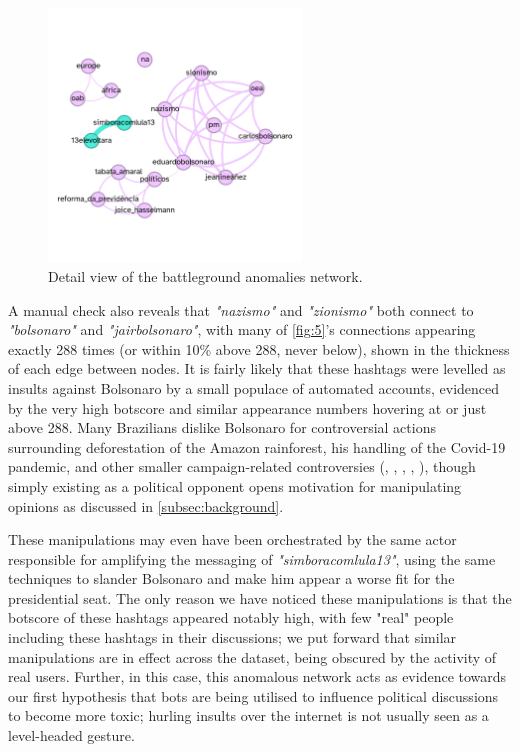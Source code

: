\documentclass[a4paper,11pt]{article}  %
\begin{document}
	\begin{figure}%
		\begin{center}
			\includegraphics[width=0.6\textwidth]{images/net_anom_detail}
		\end{center}
		\caption{Detail view of the battleground anomalies network.}
		\label{fig:5}
	\end{figure}

	A manual check also reveals that \textit{"nazismo"} and \textit{"zionismo"} both connect to \textit{"bolsonaro"} and \textit{"jairbolsonaro"}, with many of \autoref{fig:5}'s connections appearing exactly 288 times (or within 10\% above 288, never below), shown in the thickness of each edge between nodes. It is fairly likely that these hashtags were levelled as insults against Bolsonaro by a small populace of automated accounts, evidenced by the very high botscore and similar appearance numbers hovering at or just above 288. Many Brazilians dislike Bolsonaro for controversial actions surrounding deforestation of the Amazon rainforest, his handling of the Covid-19 pandemic, and other smaller campaign-related controversies (\parencite{BrazilianAmazonDeforestation}, \parencite{trevisaniBrazilBolsonaroFires2019}, \parencite{dupeyronJustTrumpBrazil2020}, \parencite{BrazilMilitaryChiefs2021}, \parencite{phillipsBrazilJairBolsonaro2018}), though simply existing as a political opponent opens motivation for manipulating opinions as discussed in \autoref{subsec:background}. 
	
	These manipulations may even have been orchestrated by the same actor responsible for amplifying the messaging of \textit{"simboracomlula13"}, using the same techniques to slander Bolsonaro and make him appear a worse fit for the presidential seat. The only reason we have noticed these manipulations is that the botscore of these hashtags appeared notably high, with few "real" people including these hashtags in their discussions; we put forward that similar manipulations are in effect across the dataset, being obscured by the activity of real users. Further, in this case, this anomalous network acts as evidence towards our first hypothesis that bots are being utilised to influence political discussions to become more toxic; hurling insults over the internet is not usually seen as a level-headed gesture.
	
\end{document}
